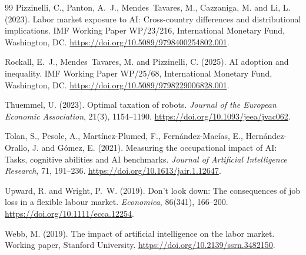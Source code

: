 \begin{thebibliography}{99}
Pizzinelli, C., Panton, A.~J., Mendes~Tavares, M., Cazzaniga, M. and Li, L. (2023).
\newblock Labor market exposure to AI: Cross-country differences and distributional implications.
\newblock IMF Working Paper WP/23/216, International Monetary Fund, Washington, DC.
\newblock \url{https://doi.org/10.5089/9798400254802.001}.

Rockall, E.~J., Mendes~Tavares, M. and Pizzinelli, C. (2025).
\newblock AI adoption and inequality.
\newblock IMF Working Paper WP/25/68, International Monetary Fund, Washington, DC.
\newblock \url{https://doi.org/10.5089/9798229006828.001}.

Thuemmel, U. (2023).
\newblock Optimal taxation of robots.
\newblock \emph{Journal of the European Economic Association}, 21(3), 1154--1190.
\newblock \url{https://doi.org/10.1093/jeea/jvac062}.

Tolan, S., Pesole, A., Mart\'{i}nez-Plumed, F., Fern\'{a}ndez-Mac\'{i}as, E., Hern\'{a}ndez-Orallo, J. and G\'{o}mez, E. (2021).
\newblock Measuring the occupational impact of AI: Tasks, cognitive abilities and AI benchmarks.
\newblock \emph{Journal of Artificial Intelligence Research}, 71, 191--236.
\newblock \url{https://doi.org/10.1613/jair.1.12647}.

Upward, R. and Wright, P.~W. (2019).
\newblock Don't look down: The consequences of job loss in a flexible labour market.
\newblock \emph{Economica}, 86(341), 166--200.
\newblock \url{https://doi.org/10.1111/ecca.12254}.

Webb, M. (2019).
\newblock The impact of artificial intelligence on the labor market.
\newblock Working paper, Stanford University.
\newblock \url{https://doi.org/10.2139/ssrn.3482150}.

\end{thebibliography}
